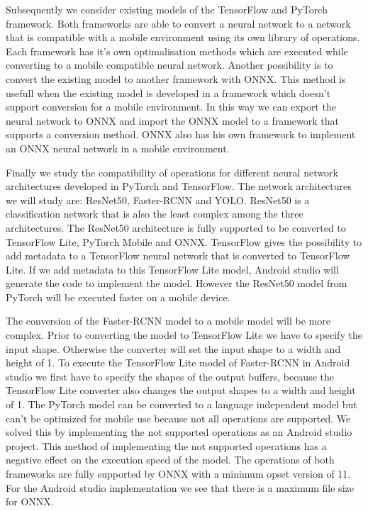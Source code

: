 Subsequently we consider existing models of the TensorFlow and PyTorch framework.
Both frameworks are able to convert a neural network to a network that is compatible with a mobile environment using its own library of operations.
Each framework has it's own optimalisation methods which are executed while converting to a mobile compatible neural network.
Another possibility is to convert the existing model to another framework with ONNX.
This method is usefull when the existing model is developed in a framework which doesn't support conversion for a mobile environment.
In this way we can export the neural network to ONNX and import the ONNX model to a framework that supports a conversion method.
ONNX also has his own framework to implement an ONNX neural network in a mobile environment.

Finally we study the compatibility of operations for different neural network architectures developed in PyTorch and TensorFlow.
The network architectures we will study are: ResNet50, Faster-RCNN and YOLO.
ResNet50 is a classification network that is also the least complex among the three architectures.
The ResNet50 architecture is fully supported to be converted to TensorFlow Lite, PyTorch Mobile and ONNX.
TensorFlow gives the possibility to add metadata to a TensorFlow neural network that is converted to TensorFlow Lite.
If we add metadata to this TensorFlow Lite model, Android studio will generate the code to implement the model.
However the ResNet50 model from PyTorch will be executed faster on a mobile device.

The conversion of the Faster-RCNN model to a mobile model will be more complex.
Prior to converting the model to TensorFlow Lite we have to specify the input shape.
Otherwise the converter will set the input shape to a width and height of 1.
To execute the TensorFlow Lite model of Faster-RCNN in Android studio we first have to specify the shapes of the output buffers, because the TensorFlow Lite converter also changes the output shapes to a width and height of 1.
The PyTorch model can be converted to a language independent model but can't be optimized for mobile use because not all operations are supported.
We solved this by implementing the not supported operations as an Android studio project.
This method of implementing the not supported operations has a negative effect on the execution speed of the model.
The operations of both frameworks are fully supported by ONNX with a minimum opset version of 11.
For the Android studio implementation we see that there is a maximum file size for ONNX.

